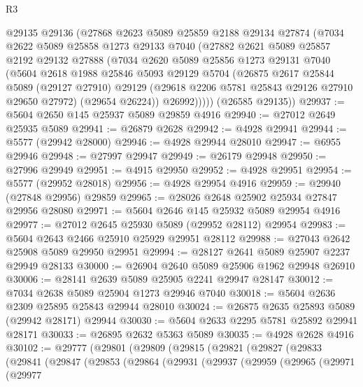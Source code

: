 \begin{lexlean}{R3}
\begin{coremodule}
      @29135
      @29136
      (@27868
        @2623
        @5089
        @25859
        @2188
        @29134
        @27874
        (@7034
          @2622
          @5089
          @25858
          @1273
          @29133
          @7040
          (@27882
            @2621
            @5089
            @25857
            @2192
            @29132
            @27888
            (@7034
              @2620
              @5089
              @25856
              @1273
              @29131
              @7040
              (@5604
                @2618
                @1988
                @25846
                @5093
                @29129
                @5704
                (@26875
                  @2617
                  @25844
                  @5089
                  (@29127 @27910)
                  @29129
                  (@29618 @2206 @5781 @25843 @29126 @27910 @29650 @27972)
                  (@29654 @26224))
                @26992)))))
      (@26585 @29135))
@29937 := @5604 @2650 @145 @25937 @5089 @29859 @4916
@29940 := @27012 @2649 @25935 @5089
@29941 := @26879 @2628
@29942 := @4928 @29941
@29944 := @5577 (@29942 @28000)
@29946 := @4928 @29944 @28010
@29947 := @6955 @29946
@29948 := @27997 @29947
@29949 := @26179 @29948
@29950 := @27996 @29949
@29951 := @4915 @29950
@29952 := @4928 @29951
@29954 := @5577 (@29952 @28018)
@29956 := @4928 @29954 @4916
@29959 := @29940 (@27848 @29956) @29859
@29965 := @28026 @2648 @25902 @25934 @27847 @29956 @28080
@29971 := @5604 @2646 @145 @25932 @5089 @29954 @4916
@29977 := @27012 @2645 @25930 @5089 (@29952 @28112) @29954
@29983 := @5604 @2643 @2466 @25910 @25929 @29951 @28112
@29988 := @27043 @2642 @25908 @5089 @29950 @29951
@29994 := @28127 @2641 @5089 @25907 @2237 @29949 @28133
@30000 := @26904 @2640 @5089 @25906 @1962 @29948 @26910
@30006 := @28141 @2639 @5089 @25905 @2241 @29947 @28147
@30012 := @7034 @2638 @5089 @25904 @1273 @29946 @7040
@30018 := @5604 @2636 @2309 @25895 @25843 @29944 @28010
@30024 := @26875 @2635 @25893 @5089 (@29942 @28171) @29944
@30030 := @5604 @2633 @2295 @5781 @25892 @29941 @28171
@30033 := @26895 @2632 @5363 @5089
@30035 := @4928 @2628 @4916
@30102 := @29777
    (@29801
      (@29809
        (@29815
          (@29821
            (@29827
              (@29833
                (@29841
                  (@29847
                    (@29853
                      (@29864
                        (@29931
                          (@29937
                            (@29959
                              (@29965
                                (@29971
                                  (@29977

\end{coremodule}
\end{lexlean}
